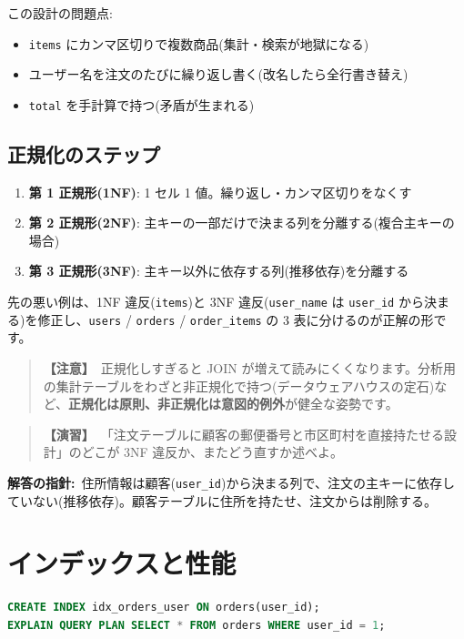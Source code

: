\documentclass{article}
\begin{document}
この設計の問題点:
\begin{itemize}
\item \texttt{items} にカンマ区切りで複数商品(集計・検索が地獄になる)
\item ユーザー名を注文のたびに繰り返し書く(改名したら全行書き替え)
\item \texttt{total} を手計算で持つ(矛盾が生まれる)
\end{itemize}

\subsection{正規化のステップ}

\begin{enumerate}
\item \textbf{第 1 正規形(1NF)}: 1 セル 1 値。繰り返し・カンマ区切りをなくす
\item \textbf{第 2 正規形(2NF)}: 主キーの一部だけで決まる列を分離する(複合主キーの場合)
\item \textbf{第 3 正規形(3NF)}: 主キー以外に依存する列(推移依存)を分離する
\end{enumerate}

先の悪い例は、1NF 違反(\texttt{items})と 3NF 違反(\texttt{user\_name} は \texttt{user\_id} から決まる)を修正し、\texttt{users} / \texttt{orders} / \texttt{order\_items} の 3 表に分けるのが正解の形です。

\begin{quote}
\textbf{【注意】}\ 正規化しすぎると JOIN が増えて読みにくくなります。分析用の集計テーブルをわざと非正規化で持つ(データウェアハウスの定石)など、\textbf{正規化は原則、非正規化は意図的例外}が健全な姿勢です。
\end{quote}

\begin{quote}
\textbf{【演習】}\ 「注文テーブルに顧客の郵便番号と市区町村を直接持たせる設計」のどこが 3NF 違反か、またどう直すか述べよ。
\end{quote}

\textbf{解答の指針:}\ 住所情報は顧客(\texttt{user\_id})から決まる列で、注文の主キーに依存していない(推移依存)。顧客テーブルに住所を持たせ、注文からは削除する。

\section{インデックスと性能}

\begin{lstlisting}[language=SQL]
CREATE INDEX idx_orders_user ON orders(user_id);
EXPLAIN QUERY PLAN SELECT * FROM orders WHERE user_id = 1;
\end{lstlisting}
\end{document}
